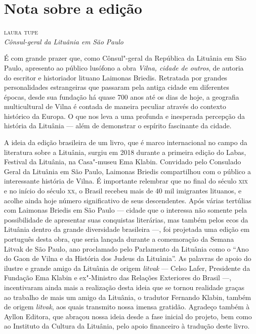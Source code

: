 \chapter[Nota sobre a edição, \textit{por Laura Tupe}]{Nota sobre a edição}

\begin{flushright}
\textsc{laura tupe}\\
\textit{Cônsul-geral da Lituânia em São Paulo}
\end{flushright}

\noindent{}É com grande prazer que, como Cônsul"-geral da República da Lituânia em
São Paulo, apresento ao público lusófono a obra \textit{Vilna, cidade de
outros}, de autoria do escritor e historiador lituano Laimonas Briedis.
Retratada por grandes personalidades estrangeiras que passaram pela
antiga cidade em diferentes épocas, desde sua fundação há quase 700 anos
até os dias de hoje, a geografia multicultural de Vilna é contada
de maneira peculiar através do contexto histórico da Europa. O que nos
leva a uma profunda e inesperada percepção da história da Lituânia ---
além de demonstrar o espírito fascinante da cidade.

A ideia da edição brasileira de um livro, que é marco internacional no
campo da literatura sobre a Lituânia, surgiu em 2018 durante a primeira
edição do Labas, Festival da Lituânia, na Casa"-museu Ema Klabin.
Convidado pelo Consulado Geral da Lituânia em São Paulo, Laimonas
Briedis compartilhou com o público a interessante história de Vilna. É
importante relembrar que no final do século \textsc{xix} e no início do século
\textsc{xx}, o Brasil recebeu mais de 40 mil imigrantes lituanos, e acolhe ainda
hoje número significativo de seus descendentes. Após várias tertúlias
com Laimonas Briedis em São Paulo --- cidade que o interessa não somente
pela possibilidade de apresentar suas conquistas literárias, mas também
pelos ecos da Lituânia dentro da grande diversidade brasileira ---, foi
projetada uma edição em português desta obra, que seria lançada durante
a comemoração da Semana Litvak de São Paulo, ano proclamado pelo
Parlamento da Lituânia como o ``Ano do Gaon de Vilna e da História
dos Judeus da Lituânia''. As palavras de apoio do ilustre e grande amigo
da Lituânia de origem \textit{litvak} --- Celso Lafer, Presidente da
Fundação Ema Klabin e ex"-Ministro das Relações Exteriores do Brasil ---,
incentivaram ainda mais a realização desta ideia que se tornou realidade
graças ao trabalho de mais um amigo da Lituânia, o tradutor Fernando
Klabin, também de origem \textit{litvak}, aos quais transmito nossa imensa
gratidão. Agradeço também à Ayllon Editora, que abraçou nossa ideia
desde a fase inicial do projeto, bem como ao Instituto da Cultura da
Lituânia, pelo apoio financeiro à tradução deste livro.


